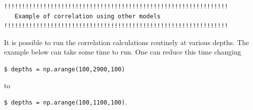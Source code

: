\documentclass[12pt]{article}
\begin{document}
    \begin{Verbatim}[commandchars=\\\{\},fontsize=\footnotesize]
!!!!!!!!!!!!!!!!!!!!!!!!!!!!!!!!!!!!!!!!!!!!!!!!!!!!!!!!!!!!!!!
   Example of correlation using other models   
!!!!!!!!!!!!!!!!!!!!!!!!!!!!!!!!!!!!!!!!!!!!!!!!!!!!!!!!!!!!!!!
    \end{Verbatim}

    \begin{center}
    \end{center}
    
    \begin{center}
    \end{center}
 It is possible to run the correlation calculations routinely at
various depths. The example below can take some time
to run. One can reduce this time changing

\verb?$ depths = np.arange(100,2900,100)?

to

\verb?$ depths = np.arange(100,1100,100)?.
\end{document}
